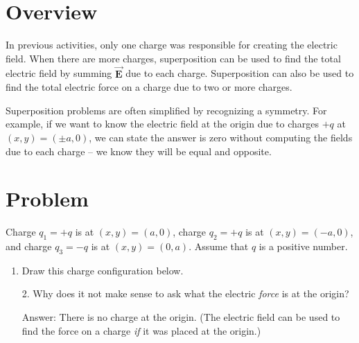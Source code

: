 \documentclass{article}
\newcommand{\bfvec}[1]{\vec{\mathbf{#1}}}
\begin{document}

\section{Overview}

In previous activities, only one charge was responsible for creating the electric field. When there are more charges, superposition can be used to find the total electric field by summing $\bfvec{E}$ due to each charge. Superposition can also be used to find the total electric force on a charge due to two or more charges.

Superposition problems are often simplified by recognizing a symmetry. For example, if we want to know the electric field at the origin due to charges $+q$ at $(x,y)=(\pm a, 0)$, we can state the answer is zero without computing the fields due to each charge -- we know they will be equal and opposite.

\section{Problem}

Charge $q_1 = +q$ is at $(x, y) = (a, 0)$, charge $q_2 = +q$ is at $(x, y) = (-a, 0)$, and charge $q_3 = -q$ is at $(x, y) = (0, a)$. Assume that $q$ is a positive number.

\begin{enumerate}

  \item Draw this charge configuration below.

\end{enumerate}

\ifsolutions

\else


\fi

\begin{enumerate}

  \item[2.] Why does it not make sense to ask what the electric \emph{force} is at the origin?

            \ifsolutions
            Answer: There is no charge at the origin. (The electric field can be used to find the force on a charge \emph{if} it was placed at the origin.)
            \else

            \vskip 24pt
            \fi

\end{enumerate}
\end{document}
